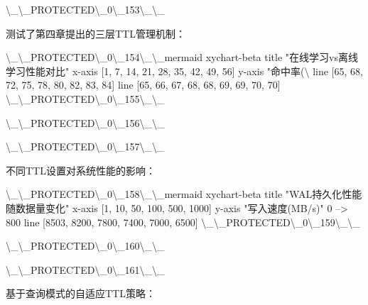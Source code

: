 \textbackslash{}_\textbackslash{}_PROTECTED\textbackslash{}_0\textbackslash{}_153\textbackslash{}_\textbackslash{}_

测试了第四章提出的三层TTL管理机制：

\textbackslash{}_\textbackslash{}_PROTECTED\textbackslash{}_0\textbackslash{}_154\textbackslash{}_\textbackslash{}_mermaid
xychart-beta
    title "在线学习vs离线学习性能对比"
    x-axis [1, 7, 14, 21, 28, 35, 42, 49, 56]
    y-axis "命中率(\textbackslash{}%
    line [65, 68, 72, 75, 78, 80, 82, 83, 84]
    line [65, 66, 67, 68, 68, 69, 69, 70, 70]
\textbackslash{}_\textbackslash{}_PROTECTED\textbackslash{}_0\textbackslash{}_155\textbackslash{}_\textbackslash{}_

\textbackslash{}_\textbackslash{}_PROTECTED\textbackslash{}_0\textbackslash{}_156\textbackslash{}_\textbackslash{}_

\textbackslash{}_\textbackslash{}_PROTECTED\textbackslash{}_0\textbackslash{}_157\textbackslash{}_\textbackslash{}_

不同TTL设置对系统性能的影响：

\textbackslash{}_\textbackslash{}_PROTECTED\textbackslash{}_0\textbackslash{}_158\textbackslash{}_\textbackslash{}_mermaid
xychart-beta
    title "WAL持久化性能随数据量变化"
    x-axis [1, 10, 50, 100, 500, 1000]
    y-axis "写入速度(MB/s)" 0 --> 800
    line [8503, 8200, 7800, 7400, 7000, 6500]
\textbackslash{}_\textbackslash{}_PROTECTED\textbackslash{}_0\textbackslash{}_159\textbackslash{}_\textbackslash{}_

\textbackslash{}_\textbackslash{}_PROTECTED\textbackslash{}_0\textbackslash{}_160\textbackslash{}_\textbackslash{}_

\textbackslash{}_\textbackslash{}_PROTECTED\textbackslash{}_0\textbackslash{}_161\textbackslash{}_\textbackslash{}_

基于查询模式的自适应TTL策略：

